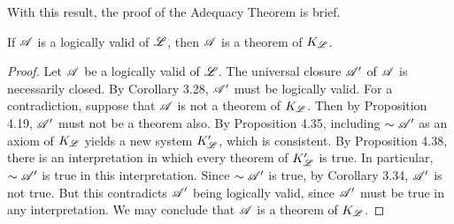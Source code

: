   With this result, the proof of the Adequacy Theorem is brief.

  \begin{proposition}
    If \(\mathscr{A}\) is a logically valid \wf{} of \(\mathscr{L}\), then \(\mathscr{A}\) is a theorem of \(K_{\mathscr{L}}\).

    \begin{proof}
      Let \(\mathscr{A}\) be a logically valid \wf{} of \(\mathscr{L}\). The universal closure \(\mathscr{A}'\) of \(\mathscr{A}\) is necessarily closed. By Corollary 3.28, \(\mathscr{A}'\) must be logically valid. For a contradiction, suppose that \(\mathscr{A}\) is not a theorem of \(K_{\mathscr{L}}\). Then by Proposition 4.19, \(\mathscr{A}'\) must not be a theorem also. By Proposition 4.35, including \(\sim\mathscr{A}'\) as an axiom of \(K_{\mathscr{L}}\) yields a new system \(K_{\mathscr{L}}'\), which is consistent. By Proposition 4.38, there is an interpretation in which every theorem of \(K_{\mathscr{L}}'\) is true. In particular, \(\sim\mathscr{A}'\) is true in this interpretation. Since \(\sim\mathscr{A}'\) is true, by Corollary 3.34, \(\mathscr{A}'\) is not true. But this contradicts \(\mathscr{A}'\) being logically valid, since \(\mathscr{A}'\) must be true in any interpretation. We may conclude that \(\mathscr{A}\) is a theorem of \(K_{\mathscr{L}}\).
    \end{proof}
    
  \end{proposition}

